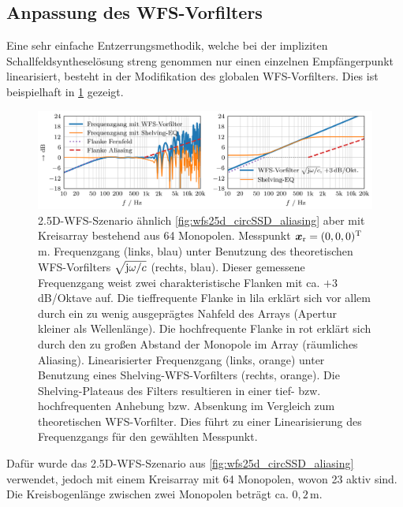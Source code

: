 \subsection{Anpassung des WFS-Vorfilters}
%
Eine sehr einfache Entzerrungsmethodik, welche bei der impliziten
Schallfeldsyntheselösung streng genommen nur einen einzelnen Empfängerpunkt
linearisiert, besteht in der Modifikation des globalen WFS-Vorfilters.
%
Dies ist beispielhaft in
\Abb\ref{fig:wfs25d_lineSSD_aliasing_eq_example} gezeigt.
%

\begin{figure}[t]
\centering
\begin{plotfigures}
\includegraphics[width=174mm]{../python/wfs25d_lineSSD_aliasing_eq_example_DEU.png}
\end{plotfigures}
\caption{2.5D-WFS-Szenario ähnlich \Abb\ref{fig:wfs25d_circSSD_aliasing} aber
mit Kreisarray bestehend aus 64 Monopolen. Messpunkt $\bm{x}_\mathrm{r} = (0,0,0)^\mathrm{T}$\,m.
%
Frequenzgang (links, blau) unter Benutzung des theoretischen WFS-Vorfilters
$\sqrt{\im \omega/c}$ (rechts, blau).
%
Dieser gemessene Frequenzgang weist zwei charakteristische Flanken mit
ca. $+3$\,dB/Oktave auf.
%
Die tieffrequente Flanke in lila erklärt sich vor allem
durch ein zu wenig ausgeprägtes Nahfeld des Arrays (Apertur kleiner als Wellenlänge).
%
Die hochfrequente Flanke in rot erklärt sich durch den zu großen Abstand der
Monopole im Array (räumliches Aliasing).
%
Linearisierter Frequenzgang (links, orange) unter Benutzung eines
Shelving-WFS-Vorfilters (rechts, orange).
%
Die Shelving-Plateaus des Filters resultieren in einer tief- bzw. hochfrequenten
Anhebung bzw. Absenkung im Vergleich zum theoretischen WFS-Vorfilter.
%
Dies führt zu einer Linearisierung des Frequenzgangs für den gewählten Messpunkt.
%
\cc
}
\label{fig:wfs25d_lineSSD_aliasing_eq_example}
\end{figure}
%
Dafür wurde das 2.5D-WFS-Szenario aus \Abb\ref{fig:wfs25d_circSSD_aliasing}
verwendet, jedoch mit einem Kreisarray mit 64 Monopolen, wovon 23 aktiv sind.
%
Die Kreisbogenlänge zwischen zwei Monopolen beträgt ca. $0{,}2$\,m.
